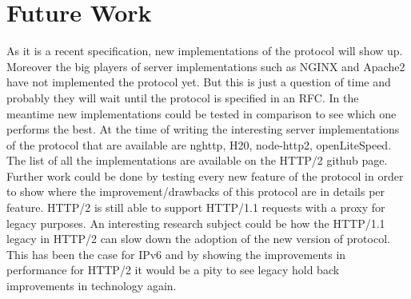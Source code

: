 \section{Future Work}
\label{furtherwork}

As it is a recent specification, new implementations of the protocol will show up. Moreover the big players of server implementations such as NGINX\cite{nginx} and Apache2 \cite{apache2} have not implemented the protocol yet. But this is just a question of time and probably they will wait until the protocol is specified in an RFC. In the meantime new implementations could be tested in comparison to see which one performs the best. At the time of writing the interesting server implementations of the protocol that are available are nghttp, H20, node-http2, openLiteSpeed. The list of all the implementations are available on the HTTP/2 github page.\cite{http2-imp}
Further work could be done by testing every new feature of the protocol in order to show where the improvement/drawbacks of this protocol are in details per feature. 
HTTP/2 is still able to support HTTP/1.1 requests with a proxy for legacy purposes. An interesting research subject could be how the  HTTP/1.1 legacy in HTTP/2 can slow down the adoption of the new version of protocol. This has been the case for IPv6 and by showing the improvements in performance for HTTP/2 it would be a pity to see legacy hold back improvements in technology again.